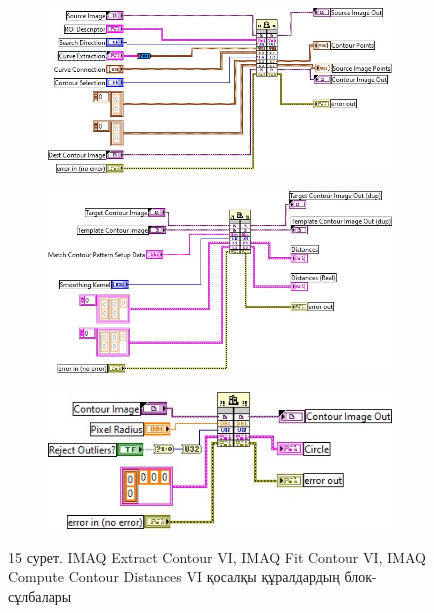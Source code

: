 \begin{figure}[H]
    \centering
    \begin{subfigure}[t]{0.45\textwidth}
        \centering
        \includegraphics[width=\textwidth]{media/ict2/image183}
        \caption*{}
    \end{subfigure}
    \begin{subfigure}[t]{0.45\textwidth}
        \centering
        \includegraphics[width=\textwidth]{media/ict2/image184}
        \caption*{}
    \end{subfigure}
    \begin{subfigure}[t]{0.45\textwidth}
        \centering
        \includegraphics[width=\textwidth]{media/ict2/image185}
        \caption*{}
    \end{subfigure}
    \caption*{15 сурет. IMAQ Extract Contour VI, IMAQ Fit Contour VI, IMAQ Compute Contour Distances VI қосалқы құралдардың блок- сұлбалары}
\end{figure}

